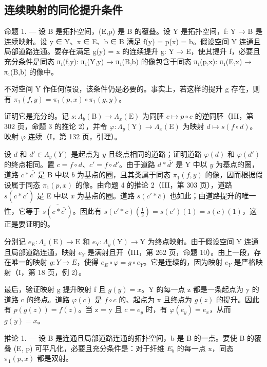 \subsection{连续映射的同伦提升条件}

命题 1. --- 设 B 是拓扑空间，(E,p) 是 B 的覆叠。设 Y 是拓扑空间，f: Y → B 是连续映射。设 y ∈ Y、x ∈ E、b ∈ B 满足 f(y) = p(x) = b。假设空间 Y 连通且局部道路连通。要存在满足 g(y) = x 的连续提升 g: Y → E，使其提升 f，必要且充分条件是同态 π₁(f,y): π₁(Y,y) → π₁(B,b) 的像包含于同态 π₁(p,x): π₁(E,x) → π₁(B,b) 的像中。

不对空间 Y 作任何假设，该条件仍是必要的。事实上，若这样的提升 g 存在，则有 \(\pi_{1}(f,y)=\pi_{1}(p,x)\circ\pi_{1}(g,y)\)。

证明它是充分的。记 \(s\colon \Lambda_{b}(\mathrm{B})\to \Lambda_{x}(\mathrm{E})\) 为同胚 \(c\mapsto p\circ c\) 的逆同胚（III，第 302 页，命题 3 的推论 2），并令 \(\varphi \colon \Lambda_y(\mathrm{Y})\to \Lambda_x(\mathrm{E})\) 为映射 \(d\mapsto s(f\circ d)\)。映射 \(\varphi\) 连续（I，第 132 页，引理）。

设 \(d\) 和 \(d' \in \Lambda_y(Y)\) 是起点为 \(y\) 且终点相同的道路；证明道路 \(\varphi(d)\) 和 \(\varphi(d')\) 的终点相同。置 \(c = f \circ d\)、\(c' = f \circ d'\)。由于道路 \(d * \overline{d'}\) 是 Y 中以 \(y\) 为基点的圈，道路 \(c * \overline{c'}\) 是 B 中以 \(b\) 为基点的圈，且其类属于同态 \(\pi_1(f, y)\) 的像，因而根据假设属于同态 \(\pi_1(p, x)\) 的像。由命题 4 的推论 2（III，第 303 页），道路 \(s(c * \overline{c'})\) 是 E 中以 \(x\) 为基点的圈。道路 \(s(c' * \overline{c})\) 也如此；由道路提升的唯一性，它等于 \(\overline{s(c * \overline{c'})}\)。因此有 \(s(c' * \overline{c})(\frac{1}{2}) = s(c')(1) = s(c)(1)\)，这正是要证明的。

分别记 \(e_{\mathrm{E}}\colon\Lambda_{x}(\mathrm{E})\to\mathrm{E}\) 和 \(e_{\mathrm{Y}}\colon\Lambda_{y}(\mathrm{Y})\to\mathrm{Y}\) 为终点映射。由于假设空间 Y 连通且局部道路连通，映射 \(e_{Y}\) 是满射且开（III，第 262 页，命题 10）。由上一段，存在唯一的映射 \(g\colon Y\to E\)，使得 \(e_{E}\circ\varphi=g\circ e_{Y}\)。它是连续的，因为映射 \(e_{Y}\) 是严格映射（I，第 18 页，例 2）。

最后，验证映射 g 提升映射 f 且 \(g(y) = x\)。Y 的每一点 z 都是一条起点为 y 的道路 c 的终点。道路 \(\varphi(c)\) 是 \(f \circ c\) 的、起点为 x 且终点为 \(g(z)\) 的提升。因此有 \(p(g(z)) = f(z)\)。当 z = y 且 \(c = e_y\) 时，有 \(\varphi(e_y) = e_x\)，从而 \(g(y) = x\)。

推论 1. --- 设 B 是连通且局部道路连通的拓扑空间，b 是 B 的一点。要使 B 的覆叠 (E, p) 可平凡化，必要且充分条件是：对于纤维 \(E_{b}\) 的每一点 x，同态 \(\pi_{1}(p, x)\) 都是双射。


